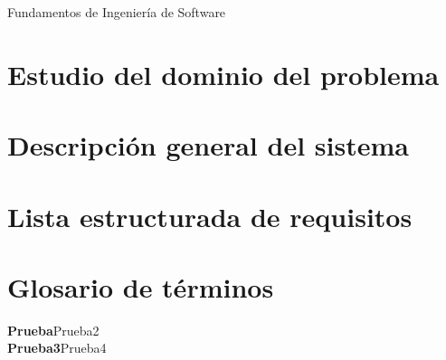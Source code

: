 \documentclass[11pt,a4paper]{article}
\newcommand{\term}[2]{\textbf{#1}\quad#2\\}
\begin{document}
{\Huge{Fundamentos de Ingeniería de Software}}

\section{Estudio del dominio del problema} %
\label{sec:estudio_del_dominio_del_problema}


\section{Descripción general del sistema} %
\label{sec:descripción_general_del_sisetema}




\section{Lista estructurada de requisitos} %
\label{sec:lista_estructurada_de_requisitos}


\section{Glosario de términos} %
\label{sec:glosario_de_términos}

\term{Prueba}{Prueba2}
\term{Prueba3}{Prueba4}



	
\end{document}
